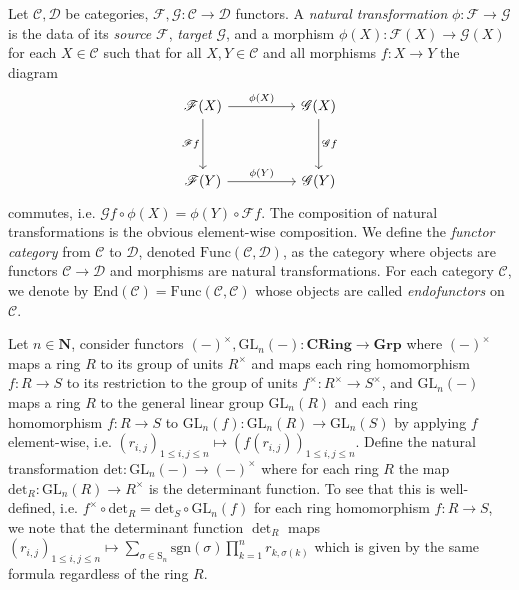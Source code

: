 \documentclass[11pt]{book}
\begin{document}
\begin{definition}Let $\mathcal C,\mathcal D$ be categories, $\mathscr{F},\mathscr{G}:\mathcal{C}\rightarrow\mathcal D$ functors. A \textit{natural transformation} $\phi:\mathscr{F}\rightarrow\mathscr{G}$ is the data of its \textit{source} $\mathscr{F}$, \textit{target} $\mathscr{G}$, and a morphism $\phi(X):\mathscr{F}(X)\rightarrow\mathscr{G}(X)$ for each $X\in\mathcal C$ such that for all $X,Y\in\mathcal C$ and all morphisms $f:X\rightarrow Y$ the diagram
\[
\begin{tikzcd}[sep = huge]
\mathscr{F}(X) \arrow[r, "\phi(X)"] \arrow[d, "\mathscr{F}f"'] & \mathscr{G}(X) \arrow[d, "\mathscr{G}f"] \\
\mathscr{F}(Y) \arrow[r, "\phi(Y)"]                 & \mathscr{G}(Y)               
\end{tikzcd}\]
commutes, i.e. $\mathscr{G}f\circ\phi(X)=\phi(Y)\circ\mathscr{F}f$. The composition of natural transformations is the obvious element-wise composition. We define the \textit{functor category} from $\mathcal C$ to $\mathcal D$, denoted $\mathrm{Func}(\mathcal C,\mathcal D)$, as the category where objects are functors $\mathcal C\rightarrow \mathcal D$ and morphisms are natural transformations. For each category $\mathcal C$, we denote by $\mathrm{End}(\mathcal C)=\mathrm{Func}(\mathcal C,\mathcal C)$ whose objects are called \textit{endofunctors} on $\mathcal C$.
\end{definition}
\begin{example}Let $n\in\mathbf N$, consider functors $(-)^{\times},\mathrm{GL}_n(-):\mathbf{CRing}\rightarrow\mathbf{Grp}$ where $(-)^{\times}$ maps a ring $R$ to its group of units $R^\times$ and maps each ring homomorphism $f:R\rightarrow S$ to its restriction to the group of units $f^{\times}:R^\times\rightarrow S^\times$, and $\mathrm{GL}_n(-)$ maps a ring $R$ to the general linear group $\mathrm{GL}_n(R)$ and each ring homomorphism $f:R\rightarrow S$ to $\mathrm{GL}_n(f):\mathrm{GL}_n(R)\rightarrow \mathrm{GL}_n(S)$ by applying $f$ element-wise, i.e. $(r_{i,j})_{1\le i,j\le n}\mapsto (f(r_{i,j}))_{1\le i,j\le n}$. Define the natural transformation $\mathrm{det}:\mathrm{GL}_n(-)\rightarrow (-)^{\times}$ where for each ring $R$ the map $\mathrm{det}_R:\mathrm{GL}_n(R)\rightarrow R^{\times}$ is the determinant function. To see that this is well-defined, i.e. $f^\times \circ \mathrm{det}_{R}=\mathrm{det}_{S} \circ \mathrm{GL}_{n}(f)$ for each ring homomorphism $f:R\rightarrow S$, we note that the determinant function $\det_R$ maps $(r_{i,j})_{1\le i,j\le n}\mapsto \sum_{\sigma\in \mathrm{S}_n}\mathrm{sgn}(\sigma)\prod_{k=1}^nr_{k,\sigma(k)}$ which is given by the same formula regardless of the ring $R$.
\end{example}
\end{document}
